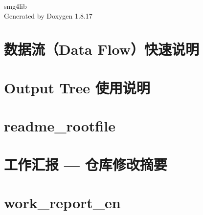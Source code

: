 \let\mypdfximage\pdfximage\def\pdfximage{\immediate\mypdfximage}\documentclass[twoside]{book}
\newcommand{\+}{\discretionary{\mbox{\scriptsize$\hookleftarrow$}}{}{}}
\newcommand{\clearemptydoublepage}{%
  \newpage{\pagestyle{empty}\cleardoublepage}%
}
\begin{document}
\hypersetup{pageanchor=false,
             bookmarksnumbered=true,
             pdfencoding=unicode
            }
\begin{titlepage}
\vspace*{7cm}
\begin{center}%
{\Large smg4lib }\\
\vspace*{1cm}
{\large Generated by Doxygen 1.8.17}\\
\end{center}
\end{titlepage}
\clearemptydoublepage
{}
\tableofcontents
\clearemptydoublepage
{}
\hypersetup{pageanchor=true}

\chapter{数据流（\+Data Flow）快速说明}
\label{md__home_tbt_workspace_dpol_smsimulator5_85_d_work_macros_dpol_data_flow_README}

\chapter{Output Tree 使用说明}
\label{md__home_tbt_workspace_dpol_smsimulator5_85_d_work_output_tree_README}

\chapter{readme\+\_\+rootfile}
\label{md__home_tbt_workspace_dpol_smsimulator5_85_d_work_rootfiles_readme_rootfile}

\chapter{工作汇报 — 仓库修改摘要}
\label{md__home_tbt_workspace_dpol_smsimulator5_85_d_work_WORK_REPORT}

\chapter{work\+\_\+report\+\_\+en}
\label{md__home_tbt_workspace_dpol_smsimulator5_85_d_work_work_report_en}

\end{document}
